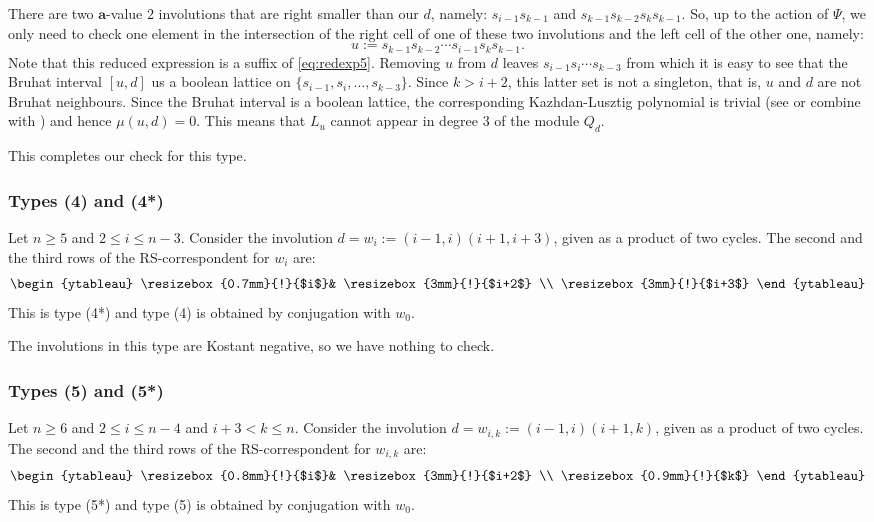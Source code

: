 \documentclass[a4paper]{amsart}
\begin{document}
There are two $\mathbf{a}$-value $2$ involutions that are
right smaller than our $d$, namely: $s_{i-1}s_{k-1}$
and $s_{k-1}s_{k-2}s_{k}s_{k-1}$. So, up to the action of $\Psi$,
we only need to check one element in the intersection
of the right cell of one of these two involutions and 
the left cell of the other one, namely:
\begin{displaymath}
u:= s_{k-1}s_{k-2}\cdots s_{i-1}s_{k}s_{k-1}.
\end{displaymath}
Note that this reduced expression is a suffix of \eqref{eq:redexp5}.
Removing $u$ from $d$ leaves $s_{i-1}s_{i}\cdots s_{k-3}$
from which it is easy to see that the Bruhat interval $[u,d]$
us a boolean lattice on $\{s_{i-1},s_{i},\dots, s_{k-3}\}$.
Since $k>i+2$, this latter set is not a singleton, that is,
$u$ and $d$ are not Bruhat neighbours. Since the Bruhat 
interval is a boolean lattice, the corresponding Kazhdan-Lusztig
polynomial is trivial 
(see \cite{BB} or combine \cite{WiDM} with \cite{Mar}) 
and hence $\mu(u,d)=0$. This means that
$L_u$ cannot appear in degree $3$ of the module $Q_d$.

This completes our check for this type.

\subsubsection{Types (4) and (4*)}\label{s6.2.4}

Let $n\geq 5$ and $2\leq i\leq n-3$. Consider the involution
$d=w_i:=(i-1,i)(i+1,i+3)$, given as a product of two cycles.
The second and the third rows of the RS-correspondent for $w_i$
are:
\begin{displaymath}
\begin{ytableau}
\resizebox{0.7mm}{!}{$i$}&
\resizebox{3mm}{!}{$i+2$}
\\
\resizebox{3mm}{!}{$i+3$} 
\end{ytableau}
\end{displaymath}
This is type (4*) and type (4) is obtained by
conjugation with $w_0$.

The involutions in this type are Kostant negative, so we have nothing to check.

\subsubsection{Types (5) and (5*)}\label{s6.2.5}

Let $n\geq 6$ and $2\leq i\leq n-4$ and $i+3<k\leq n$. Consider the involution
$d=w_{i,k}:=(i-1,i)(i+1,k)$, given as a product of two cycles.
The second and the third rows of the RS-correspondent for $w_{i,k}$
are:
\begin{displaymath}
\begin{ytableau}
\resizebox{0.8mm}{!}{$i$}&
\resizebox{3mm}{!}{$i+2$}
\\
\resizebox{0.9mm}{!}{$k$} 
\end{ytableau}
\end{displaymath}
This is type (5*) and type (5) is obtained by
conjugation with $w_0$.
\end{document}
